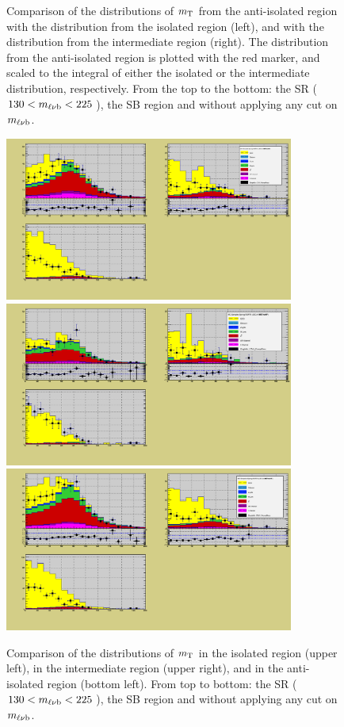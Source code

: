 \begin{figure}[H!]
\begin{center}
\caption{\label{fig:qcdShapeComparison2J1TmtW} Comparison of the distributions of $m_{\mathrm{\rm T}}$ from the anti-isolated region with the distribution from the isolated region (left), and with the distribution from the intermediate region (right). The distribution from the anti-isolated region is plotted with the red marker, and scaled to the integral of either the isolated or the intermediate distribution, respectively. From the top to the bottom: the SR ($130<m_{\ell\nu \mathrm{b}}<225\,$\GeV), the SB region and without applying any cut on $m_{\ell\nu \mathrm{b}}$.}
\end{center}
\end{figure}


\begin{figure}[h]
\begin{center}
\includegraphics[width=9.5cm]{figures/2J1T/MTW_Different_iso_regions_SR.png}
\includegraphics[width=9.5cm]{figures/2J1T/MTW_Different_iso_regions_SB.png}
\includegraphics[width=9.5cm]{figures/2J1T/MTW_Different_iso_regions_inclusive_mTop.png}
\caption{\label{fig:sampleComparisonDifferentIsoRegions2J1TmtW} Comparison of the distributions of $m_{\mathrm{\rm T}}$ in the isolated region (upper left), in the intermediate region (upper right), and in the anti-isolated region (bottom left). From top to bottom: the SR ($130<m_{\ell\nu \mathrm{b}}<225\,$\GeV), the SB region and without applying any cut on $m_{\ell\nu \mathrm{b}}$.}
\end{center}
\end{figure}
 
